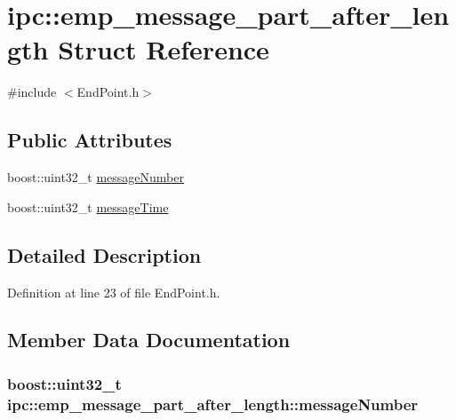 \hypertarget{structipc_1_1emp__message__part__after__length}{}\section{ipc\+:\+:emp\+\_\+message\+\_\+part\+\_\+after\+\_\+length Struct Reference}
\label{structipc_1_1emp__message__part__after__length}


{\ttfamily \#include $<$End\+Point.\+h$>$}

\subsection*{Public Attributes}
\begin{DoxyCompactItemize}
\item 
boost\+::uint32\+\_\+t \hyperlink{structipc_1_1emp__message__part__after__length_aebdb6613dfd77c2b01b408d4f3efca2e}{message\+Number}
\item 
boost\+::uint32\+\_\+t \hyperlink{structipc_1_1emp__message__part__after__length_aa3063ea0ba9535359c290d34a2a43d46}{message\+Time}
\end{DoxyCompactItemize}


\subsection{Detailed Description}


Definition at line 23 of file End\+Point.\+h.



\subsection{Member Data Documentation}
\subsubsection[{\texorpdfstring{message\+Number}{messageNumber}}]{\setlength{\rightskip}{0pt plus 5cm}boost\+::uint32\+\_\+t ipc\+::emp\+\_\+message\+\_\+part\+\_\+after\+\_\+length\+::message\+Number}\hypertarget{structipc_1_1emp__message__part__after__length_aebdb6613dfd77c2b01b408d4f3efca2e}{}\label{structipc_1_1emp__message__part__after__length_aebdb6613dfd77c2b01b408d4f3efca2e}


